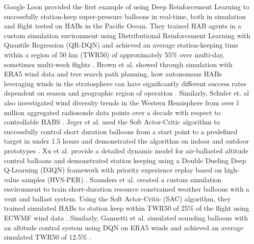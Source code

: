 Google Loon provided the first example of using Deep Reinforcement Learning to successfully station-keep super-pressure balloons in real-time, both in simulation and flight tested on HABs in the Pacific Ocean.  They trained HAB agents in a custom simulation environment using  Distributional Reinforcement Learning with Quantile Regression (QR-DQN) and achieved an average station-keeping time within a region of 50 km (TWR50) of approximately 55\% over multi-day, sometimes multi-week flights \cite{bellemare2020autonomous}. 
Brown et al. showed through simulation with ERA5 wind data and tree search path planning, how autonomous HABs leveraging winds in the
stratosphere can have significantly different success rates dependent on season and geographic region of operation \cite{brown2024seasonal}.
Similarly,  Schuler et. al also investigated wind diversity trends in the Western Hemisphere from over 1 million aggregated radiosonde data points over a decade with respect to controllable HABS \cite{schuler2025wind}.
Jeger et al. used the Soft Actor-Critic algorithm to successfully control short duration balloons from a start point to a predefined target in under 1.5 hours and demonstrated the algorithm on indoor and outdoor prototypes \cite{jeger2023reinforcement}. Xu et al. provide a detailed dynamic model for air-ballasted altitude control balloons and demonstrated station keeping using a Double Dueling Deep Q-Learning (D3QN) framework with priority experience replay based on high-value samples (HVS-PER) \cite{xu2022station}.
Saunders et al. created a custom simulation environment to train short-duration resource constrained weather balloons with a vent and ballast system. Using the Soft Actor-Critic (SAC) algorithm, they trained simulated HABs to station keep within TWR50 of 25\% of the flight using ECWMF wind data \cite{saunders2023}. 
Similarly,  Gannetti et al. simulated sounding balloons with an altitude control system using DQN on ERA5 winds and achieved an average simulated TWR50 of 12.5\% \cite{gannetti2023navigation}. 







